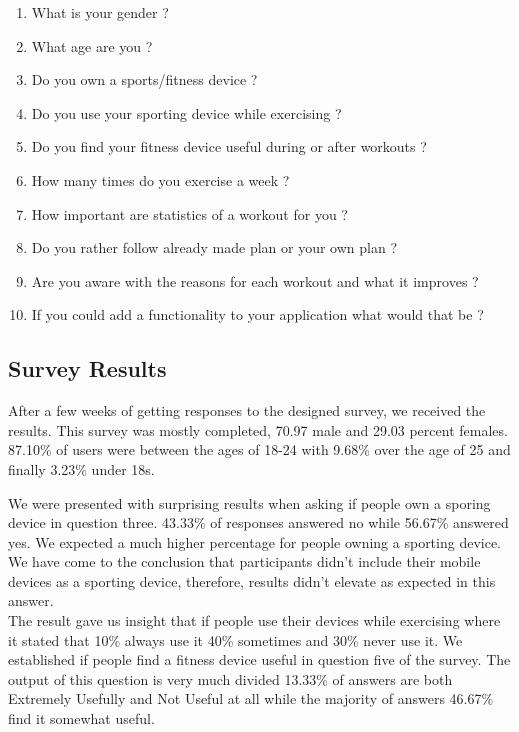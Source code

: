 \documentclass[a4paper,12pt]{report}
\begin{document}
\begin{enumerate}
    \item What is your gender ?
    \item What age are you ? 
    \item Do you own a sports/fitness device ?
    \item Do you use your sporting device while exercising ?
    \item Do you find your fitness device useful during or after workouts ?
    \item How many times do you exercise a week ?
    \item How important are statistics of a workout for you ?
    \item Do you rather follow already made plan or your own plan ?
    \item Are you aware with the reasons for each workout and what it improves ?
    \item If you could add a functionality to your application what would that be ?
\end{enumerate}
\newpage
\subsection{Survey Results}

After a few weeks of getting responses to the designed survey, we received the results.
This survey was mostly completed, 70.97 male and 29.03 percent females.
87.10\% of users were between the ages of 18-24 with 9.68\% over the age of 25 and finally 3.23\% under 18s.

We were presented with surprising results when asking if people own a sporing device in question three.
43.33\% of responses answered no while 56.67\% answered yes. We expected a much higher percentage for people owning a sporting device. We have come to the conclusion that participants didn't include their mobile devices as a sporting device, therefore, results didn't elevate as expected in this answer.\\ 

The result gave us insight that if people use their devices while exercising where it stated that 10\% always use it 40\% sometimes and 30\% never use it.
We established if people find a fitness device useful in question five of the survey. The output of this question is very much divided 13.33\% of answers are both Extremely Usefully and Not Useful at all while the majority of answers 46.67\% find it somewhat useful.
\end{document}
